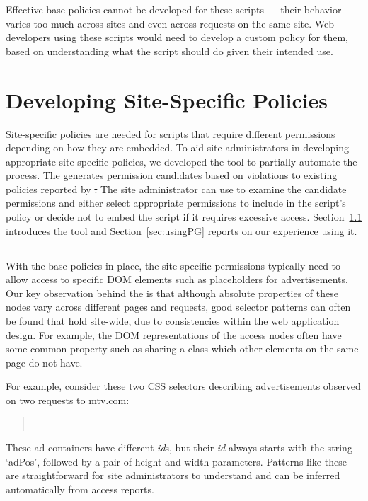 Effective base policies cannot be developed for these scripts --- their
behavior varies too much across sites and even across requests on the
same site.  Web developers using these scripts would need to develop a
custom policy for them, based on understanding what the script should do
given their intended use.


\section{Developing Site-Specific Policies}\label{sec:sspolicies}

Site-specific policies are needed for scripts that require different
permissions depending on how they are embedded. To aid site
administrators in developing appropriate site-specific policies, we
developed the \pg tool to partially automate the process.  The \pg
generates permission candidates based on violations to existing policies
reported by \st.  The site administrator can use \vis to examine the
candidate permissions and either select appropriate permissions to
include in the script's policy or decide not to embed the script if it
requires excessive access.  Section~\ref{sec:policyGen} introduces the
\pg tool and Section~\ref{sec:usingPG} reports on our experience using
it.

\subsection{\pg}\label{sec:policyGen}

With the base policies in place, the site-specific permissions typically
need to allow access to specific DOM elements such as placeholders for advertisements.
Our key observation behind the \pg is that although
absolute properties of these nodes vary across different pages and requests, good selector patterns can often be found that hold site-wide, due to consistencies within the web application design.  For example, the DOM
representations of the access nodes often have some common property such
as sharing a class which other elements on the same page do not have.

For example, consider these two CSS selectors describing advertisements observed on two requests to
\url{mtv.com}:
\begin{quote}
\\
\end{quote}
These ad containers have different \emph{id}s, but their \emph{id} always starts with the string `adPos', followed by a pair
of height and width parameters.  Patterns like these are straightforward for site administrators to understand and can be inferred automatically from access reports.  

